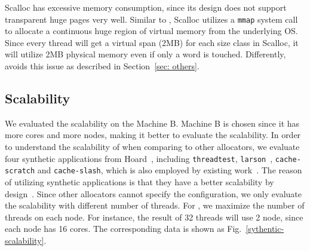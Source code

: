  Scalloc has excessive memory consumption, since its design does not support transparent huge pages very well. Similar to \NM{}, Scalloc utilizes a \texttt{mmap} system call to allocate a continuous huge region of virtual memory from the underlying OS. Since every thread will get a virtual span (2MB) for each size class in Scalloc, it will utilize 2MB physical memory even if only a word is touched. Differently, \NM{} avoids this issue as described in Section~\ref{sec: others}.
 

\subsection{Scalability}
\label{sec:scale}

We evaluated the scalability on the Machine B. Machine B is chosen since it has more cores and more nodes, making it better to evaluate the scalability. In order to understand the scalability of \NM{} when comparing to other allocators, we evaluate four synthetic applications from Hoard~\cite{Hoard}, including \texttt{threadtest}, \texttt{larson}~\cite{Larson}, \texttt{cache-scratch} and \texttt{cache-slash}, which is also employed by existing work~\cite{Scalloc}. The reason of utilizing synthetic applications is that they have a better scalability by design~\cite{Scalloc}. Since other allocators cannot specify the configuration, we only evaluate the scalability with different number of threads. For \NM{}, we maximize the number of threads on each node. For instance, the result of 32 threads will use 2 node, since each node has 16 cores. The corresponding data is shown as Fig.~\ref{sythentic-scalability}. 


